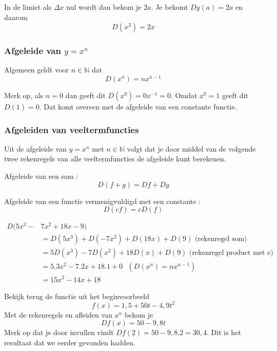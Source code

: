 In de limiet als $\Delta x$ nul wordt dan bekom je $2a$.
Je bekomt $Dy(a)=2a$ en daarom 
\[D(x^2)=2x\]

\subsubsection{Afgeleide van $y=x^n$}

Algemeen geldt voor $n\in \mathbb{N}$ dat 
\[D(x^n)=nx^{n-1}\]

Merk op, als $n=0$ dan geeft dit $D(x^0)=0x^{-1}=0$.
Omdat $x^0=1$ geeft dit $D(1)=0$.
Dat komt overeen met de afgeleide van een constante functie.

\subsubsection{Afgeleiden van veeltermfuncties}

Uit de afgeleide van $y=x^n$ met $n\in \mathbb{N}$ volgt dat je door middel van de volgende twee rekenregels van alle veeltermfuncties de afgeleide kunt berekenen.

\begin{eigenschap} Afgeleide van een som : \\
\[ D(f+g)=Df+Dg\]
\end{eigenschap}

\begin{eigenschap} Afgeleide van een functie vermenigvuldigd met een constante :
\[ D(cf)=cD(f)\]
\end{eigenschap}

\begin{voorbeeld}
	\begin{equation*}
	\begin{split}
	D(5x^3-&7x^2+18x-9)\\
	&=D(5x^3)+D(-7x^2)+D(18x)+D(9) \text{ (rekenregel som)}\\
	&=5D(x^3)-7D(x^2)+18D(x)+D(9) \text{ (rekenregel product met c)}\\
	&=5.3x^2-7.2x+18.1+0 \text{ $(D(x^n)=nx^{n-1})$}\\
	&=15x^2-14x+18
	\end{split}
	\end{equation*}
\end{voorbeeld}

\begin{voorbeeld}
	Bekijk terug de functie uit het beginvoorbeeld
	\[
	f(x)=1,5+50t-4,9t^2
	\]
	Met de rekenregels en afleiden van $x^n$ bekom je
	\[
	Df(x)=50-9,8t
	\]
	Merk op dat je door invullen vindt $Df(2)=50-9,8.2=30,4$.
	Dit is het resultaat dat we eerder gevonden hadden.
\end{voorbeeld}

